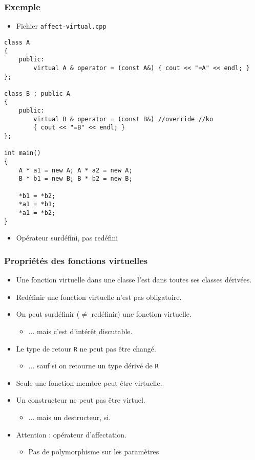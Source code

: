 \begin{frame}[containsverbatim]
\frametitle{Exemple}
\begin{itemize}
\item Fichier \texttt{affect-virtual.cpp}
\end{itemize}
\begin{lstlisting}
class A
{
	public:
		virtual A & operator = (const A&) { cout << "=A" << endl; }
};

class B : public A
{
	public:
		virtual B & operator = (const B&) //override //ko
		{ cout << "=B" << endl; }
};

int main()
{
	A * a1 = new A; A * a2 = new A;
	B * b1 = new B; B * b2 = new B;

	*b1 = *b2;
	*a1 = *b1;
	*a1 = *b2;
}
\end{lstlisting}
\begin{itemize}
\item Opérateur surdéfini, pas redéfini
\end{itemize}
\end{frame}

\begin{frame}
\frametitle{Propriétés des fonctions virtuelles}
\begin{itemize}[<+->]
\item Une fonction virtuelle dans une classe l'est dans toutes ses classes dérivées.
\item Redéfinir une fonction virtuelle n'est pas obligatoire.
\item On peut surdéfinir ($\neq$ redéfinir) une fonction virtuelle.
	\begin{itemize}
	\item ... mais c'est d'intérêt discutable.
	\end{itemize}
\item Le type de retour \texttt{R} ne peut pas être changé.
	\begin{itemize}
	\item ... sauf si on retourne un type dérivé de \texttt{R}
	\end{itemize}
\item Seule une fonction membre peut être virtuelle.
\item Un constructeur ne peut pas être virtuel.
	\begin{itemize}
	\item ... mais un destructeur, si.
	\end{itemize}
\item Attention : opérateur d'affectation.
	\begin{itemize}
	\item Pas de polymorphisme sur les paramètres
	\end{itemize}
\end{itemize}
\end{frame}

